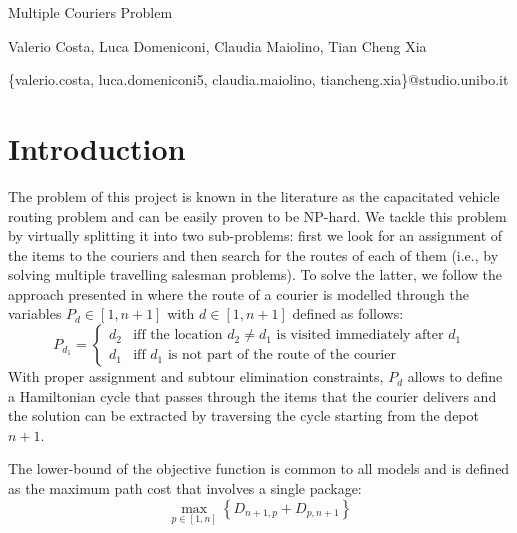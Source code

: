 \documentclass{article}
\begin{document}
    \begin{titlepage}
        \begin{center}
            {\LARGE Multiple Couriers Problem}
            \vspace*{1em}
            
            Valerio Costa, Luca Domeniconi, Claudia Maiolino, Tian Cheng Xia

            \centerline{\{valerio.costa, luca.domeniconi5, claudia.maiolino, tiancheng.xia\}@studio.unibo.it}
        \end{center}
    \end{titlepage}

    \thispagestyle{plain}

    \section{Introduction} \label{sec:intro}
    The problem of this project is known in the literature as the capacitated vehicle routing problem and can be easily proven to be NP-hard. We tackle this problem by virtually splitting it into two sub-problems: first we look for an assignment of the items to the couriers and then search for the routes of each of them (i.e., by solving multiple travelling salesman problems). To solve the latter, we follow the approach presented in \cite{vrp} where the route of a courier is modelled through the variables $P_d \in [1, n+1]$ with $d \in [1, n+1]$ defined as follows:
    \begin{equation}
        \label{eq:path_def}
        P_{d_1} = \begin{cases}
            d_2 & \text{iff the location $d_2 \neq d_1$ is visited immediately after $d_1$}\\
            d_1 & \text{iff $d_1$ is not part of the route of the courier}
        \end{cases}
    \end{equation} 
    With proper assignment and subtour elimination constraints, $P_d$ allows to define a Hamiltonian cycle that passes through the items that the courier delivers and the solution can be extracted by traversing the cycle starting from the depot $n+1$.

    The lower-bound of the objective function is common to all models and is defined as the maximum path cost that involves a single package:
    \begin{equation}
        \max_{p \in [1, n]} \left\{ D_{n+1, p} + D_{p, n+1} \right\}
    \end{equation}
\end{document}
